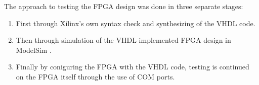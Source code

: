 The approach to testing the FPGA design was done in three separate stages:
\begin{enumerate}
	\item First through Xilinx's \cite{xilinx-ise} own syntax check and
synthesizing of the VHDL code.
	\item Then through simulation of the VHDL implemented FPGA design in
ModelSim \cite{modelsim}.
	\item Finally by coniguring the FPGA with the VHDL code, testing is
continued on the FPGA itself through the use of COM ports.
\end{enumerate}
